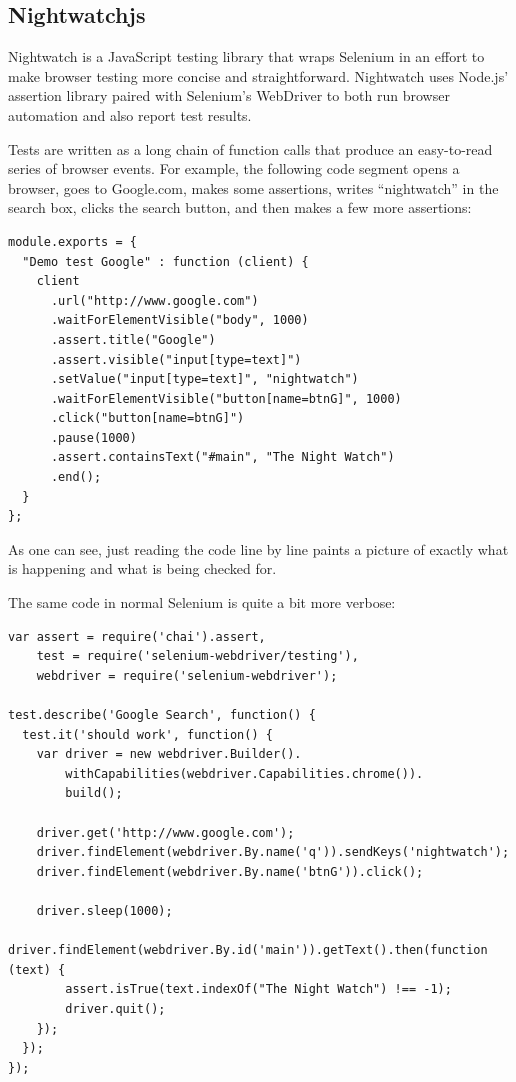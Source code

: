 \documentclass[12pt]{ucthesis}
\begin{document}
\subsection{Nightwatchjs}
Nightwatch\cite{NightwatchJS} is a JavaScript testing library that wraps Selenium in an effort to make browser testing more concise and straightforward. Nightwatch uses Node.js' assertion library paired with Selenium's WebDriver to both run browser automation and also report test results.

Tests are written as a long chain of function calls that produce an easy-to-read series of browser events. For example, the following code segment opens a browser, goes to Google.com, makes some assertions, writes ``nightwatch'' in the search box, clicks the search button, and then makes a few more assertions:
\begin{lstlisting}
module.exports = {
  "Demo test Google" : function (client) {
    client
      .url("http://www.google.com")
      .waitForElementVisible("body", 1000)
      .assert.title("Google")
      .assert.visible("input[type=text]")
      .setValue("input[type=text]", "nightwatch")
      .waitForElementVisible("button[name=btnG]", 1000)
      .click("button[name=btnG]")
      .pause(1000)
      .assert.containsText("#main", "The Night Watch")
      .end();
  }
};
\end{lstlisting}
As one can see, just reading the code line by line paints a picture of exactly what is happening and what is being checked for. 

The same code in normal Selenium is quite a bit more verbose:
\begin{lstlisting}
var assert = require('chai').assert,
    test = require('selenium-webdriver/testing'),
    webdriver = require('selenium-webdriver');

test.describe('Google Search', function() {
  test.it('should work', function() {
    var driver = new webdriver.Builder().
        withCapabilities(webdriver.Capabilities.chrome()).
        build();

    driver.get('http://www.google.com');
    driver.findElement(webdriver.By.name('q')).sendKeys('nightwatch');
    driver.findElement(webdriver.By.name('btnG')).click();

    driver.sleep(1000);
    driver.findElement(webdriver.By.id('main')).getText().then(function (text) {
        assert.isTrue(text.indexOf("The Night Watch") !== -1);
        driver.quit();
    });
  });
});
\end{lstlisting}
\end{document}
